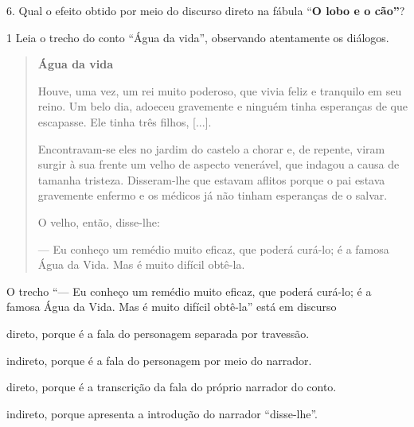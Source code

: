 \begin{escolha}
\begin{escolha}
\begin{escolha}
6. Qual o efeito obtido por meio do discurso direto na fábula ``\textbf{O
lobo e o cão''}?



\num{1} Leia o trecho do conto ``Água da vida'', observando atentamente 
os diálogos.


\begin{quote}
\textbf{Água da vida}

Houve, uma vez, um rei muito poderoso, que vivia feliz e tranquilo em
seu reino. Um belo dia, adoeceu gravemente e ninguém tinha esperanças de
que escapasse. Ele tinha três filhos, {[}...{]}.

Encontravam-se eles no jardim do castelo a chorar e, de repente, viram
surgir à sua frente um velho de aspecto venerável, que indagou a causa
de tamanha tristeza. Disseram-lhe que estavam aflitos porque o pai
estava gravemente enfermo e os médicos já não tinham esperanças de o
salvar.

O velho, então, disse-lhe:

--- Eu conheço um remédio muito eficaz, que poderá curá-lo; é a famosa
Água da Vida. Mas é muito difícil obtê-la.
\end{quote}


O trecho ``--- Eu conheço um remédio muito eficaz, que poderá curá-lo; é a
famosa Água da Vida. Mas é muito difícil obtê-la'' está em discurso

\begin{escolha}
\item direto, porque é a fala do personagem separada por travessão.

\item indireto, porque é a fala do personagem por meio do narrador.

\item direto, porque é a transcrição da fala do próprio narrador do conto.

\item indireto, porque apresenta a introdução do narrador ``disse-lhe''.
\end{escolha}


\end{escolha}
\end{escolha}
\end{escolha}
